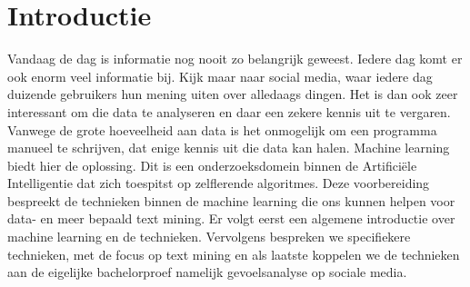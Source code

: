 \chapter{Introductie}\label{introductie}
Vandaag de dag is informatie nog nooit zo belangrijk geweest. Iedere dag komt er ook enorm veel informatie bij. Kijk maar naar social media, waar iedere dag duizende gebruikers hun mening uiten over alledaags dingen. Het is dan ook zeer interessant om die data te analyseren en daar een zekere kennis uit te vergaren. Vanwege de grote hoeveelheid aan data is het onmogelijk om een programma manueel te schrijven, dat enige kennis uit die data kan halen. Machine learning biedt hier de oplossing. Dit is een onderzoeksdomein binnen de Artifici\"ele Intelligentie dat zich toespitst op zelflerende algoritmes. Deze voorbereiding bespreekt de technieken binnen de machine learning die ons kunnen helpen voor data- en meer bepaald text mining. Er volgt eerst een algemene introductie over machine learning en de technieken. Vervolgens bespreken we specifiekere technieken, met de focus op text mining en als laatste koppelen we de technieken aan de eigelijke bachelorproef namelijk gevoelsanalyse op sociale media.
